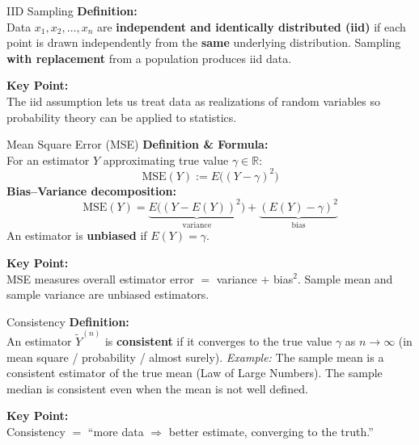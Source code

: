 \documentclass{beamer}
\begin{document}
\begin{frame}{IID Sampling}
\textbf{Definition:}\\[0.5mm]
Data $x_1, x_2, \dots, x_n$ are \textbf{independent and identically distributed (iid)} if each point is drawn independently from the \textbf{same} underlying distribution. Sampling \textbf{with replacement} from a population produces iid data.

\vspace{1.5mm}
\textbf{Key Point:}\\[0.5mm]
The iid assumption lets us treat data as realizations of random variables so probability theory can be applied to statistics.
\vspace{1.5mm}
\end{frame}

\begin{frame}{Mean Square Error (MSE)}
\textbf{Definition \& Formula:}\\[0.5mm]
For an estimator $Y$ approximating true value $\gamma \in \mathbb{R}$:
\[
\text{MSE}(Y) := E\big((Y-\gamma)^2\big)
\]
\textbf{Bias--Variance decomposition:}
\[
\text{MSE}(Y) = \underbrace{E\big((Y-E(Y))^2\big)}_{\text{variance}} + \underbrace{(E(Y)-\gamma)^2}_{\text{bias}}
\]
An estimator is \textbf{unbiased} if $E(Y) = \gamma$.

\vspace{1.5mm}
\textbf{Key Point:}\\[0.5mm]
MSE measures overall estimator error $=$ variance $+$ bias$^2$. Sample mean and sample variance are unbiased estimators.
\vspace{1.5mm}
\end{frame}

\begin{frame}{Consistency}
\textbf{Definition:}\\[0.5mm]
An estimator $\tilde{Y}^{(n)}$ is \textbf{consistent} if it converges to the true value $\gamma$ as $n \to \infty$ (in mean square / probability / almost surely).
\vspace{1.5mm}
\textit{Example:} The sample mean is a consistent estimator of the true mean (Law of Large Numbers). The sample median is consistent even when the mean is not well defined.

\vspace{1.5mm}
\textbf{Key Point:}\\[0.5mm]
Consistency $=$ ``more data $\Rightarrow$ better estimate, converging to the truth.''
\end{frame}
\end{document}
